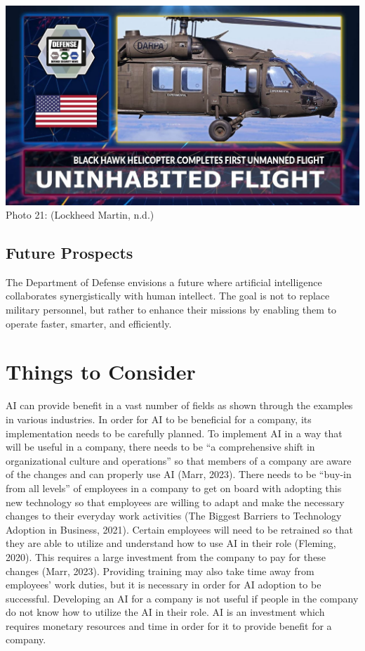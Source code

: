 \documentclass[
]{article}
\begin{document}
\includegraphics{Hawk.jpg}
Photo 21: (Lockheed Martin, n.d.)

\hypertarget{future-prospects}{%
\subsection{Future Prospects}\label{future-prospects}}

The Department of Defense envisions a future where artificial intelligence collaborates synergistically with human intellect. The goal is not to replace military personnel, but rather to enhance their missions by enabling them to operate faster, smarter, and efficiently.

\hypertarget{things-to-consider}{%
\section{Things to Consider}\label{things-to-consider}}

AI can provide benefit in a vast number of fields as shown through the examples in various industries. In order for AI to be beneficial for a company, its implementation needs to be carefully planned. To implement AI in a way that will be useful in a company, there needs to be ``a comprehensive shift in organizational culture and operations'' so that members of a company are aware of the changes and can properly use AI (Marr, 2023). There needs to be ``buy-in from all levels'' of employees in a company to get on board with adopting this new technology so that employees are willing to adapt and make the necessary changes to their everyday work activities (The Biggest Barriers to Technology Adoption in Business, 2021). Certain employees will need to be retrained so that they are able to utilize and understand how to use AI in their role (Fleming, 2020). This requires a large investment from the company to pay for these changes (Marr, 2023). Providing training may also take time away from employees' work duties, but it is necessary in order for AI adoption to be successful. Developing an AI for a company is not useful if people in the company do not know how to utilize the AI in their role. AI is an investment which requires monetary resources and time in order for it to provide benefit for a company.
\end{document}
